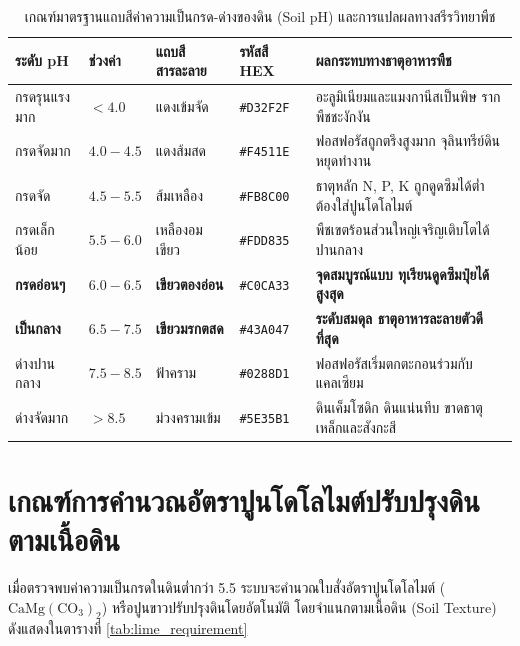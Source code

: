 \begin{table}[H]
\centering
\caption{เกณฑ์มาตรฐานแถบสีค่าความเป็นกรด-ด่างของดิน (Soil pH) และการแปลผลทางสรีรวิทยาพืช}
\label{tab:soil_ph_color_scale}
\begin{tabularx}{\textwidth}{p{2.6cm}p{1.8cm}p{2.8cm}p{1.8cm}Y}
    \toprule
    \textbf{ระดับ pH} & \textbf{ช่วงค่า} & \textbf{แถบสีสารละลาย} & \textbf{รหัสสี HEX} & \textbf{ผลกระทบทางธาตุอาหารพืช} \\
    \midrule
    กรดรุนแรงมาก & $< 4.0$ & แดงเข้มจัด & \texttt{\#D32F2F} & อะลูมิเนียมและแมงกานีสเป็นพิษ รากพืชชะงักงัน \\
    กรดจัดมาก & $4.0 - 4.5$ & แดงส้มสด & \texttt{\#F4511E} & ฟอสฟอรัสถูกตรึงสูงมาก จุลินทรีย์ดินหยุดทำงาน \\
    กรดจัด & $4.5 - 5.5$ & ส้มเหลือง & \texttt{\#FB8C00} & ธาตุหลัก N, P, K ถูกดูดซึมได้ต่ำ ต้องใส่ปูนโดโลไมต์ \\
    กรดเล็กน้อย & $5.5 - 6.0$ & เหลืองอมเขียว & \texttt{\#FDD835} & พืชเขตร้อนส่วนใหญ่เจริญเติบโตได้ปานกลาง \\
    \textbf{กรดอ่อนๆ} & $\mathbf{6.0 - 6.5}$ & \textbf{เขียวตองอ่อน} & \texttt{\#C0CA33} & \textbf{จุดสมบูรณ์แบบ ทุเรียนดูดซึมปุ๋ยได้สูงสุด} \\
    \textbf{เป็นกลาง} & $\mathbf{6.5 - 7.5}$ & \textbf{เขียวมรกตสด} & \texttt{\#43A047} & \textbf{ระดับสมดุล ธาตุอาหารละลายตัวดีที่สุด} \\
    ด่างปานกลาง & $7.5 - 8.5$ & ฟ้าคราม & \texttt{\#0288D1} & ฟอสฟอรัสเริ่มตกตะกอนร่วมกับแคลเซียม \\
    ด่างจัดมาก & $> 8.5$ & ม่วงครามเข้ม & \texttt{\#5E35B1} & ดินเค็มโซดิก ดินแน่นทึบ ขาดธาตุเหล็กและสังกะสี \\
    \bottomrule
\end{tabularx}
\end{table}

\section{เกณฑ์การคำนวณอัตราปูนโดโลไมต์ปรับปรุงดินตามเนื้อดิน}

เมื่อตรวจพบค่าความเป็นกรดในดินต่ำกว่า 5.5 ระบบจะคำนวณใบสั่งอัตราปูนโดโลไมต์ ($\text{CaMg}(\text{CO}_3)_2$) หรือปูนขาวปรับปรุงดินโดยอัตโนมัติ โดยจำแนกตามเนื้อดิน (Soil Texture) ดังแสดงในตารางที่ \ref{tab:lime_requirement}

